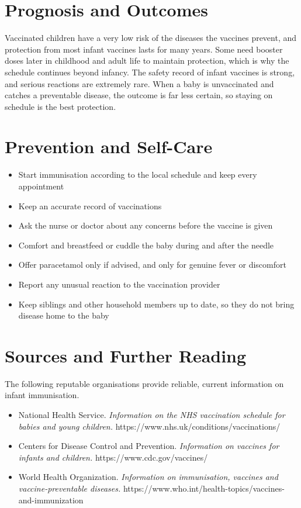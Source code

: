 \section*{Prognosis and Outcomes}
Vaccinated children have a very low risk of the diseases the vaccines prevent, and protection from most infant vaccines lasts for many years. Some need booster doses later in childhood and adult life to maintain protection, which is why the schedule continues beyond infancy. The safety record of infant vaccines is strong, and serious reactions are extremely rare. When a baby is unvaccinated and catches a preventable disease, the outcome is far less certain, so staying on schedule is the best protection.

\section*{Prevention and Self-Care}
\begin{itemize}
    \item Start immunisation according to the local schedule and keep every appointment
    \item Keep an accurate record of vaccinations
    \item Ask the nurse or doctor about any concerns before the vaccine is given
    \item Comfort and breastfeed or cuddle the baby during and after the needle
    \item Offer paracetamol only if advised, and only for genuine fever or discomfort
    \item Report any unusual reaction to the vaccination provider
    \item Keep siblings and other household members up to date, so they do not bring disease home to the baby
\end{itemize}

\section*{Sources and Further Reading}
The following reputable organisations provide reliable, current information on infant immunisation.

\begin{itemize}
    \item National Health Service. \textit{Information on the NHS vaccination schedule for babies and young children.} https://www.nhs.uk/conditions/vaccinations/
    \item Centers for Disease Control and Prevention. \textit{Information on vaccines for infants and children.} https://www.cdc.gov/vaccines/
    \item World Health Organization. \textit{Information on immunisation, vaccines and vaccine-preventable diseases.} https://www.who.int/health-topics/vaccines-and-immunization
\end{itemize}
